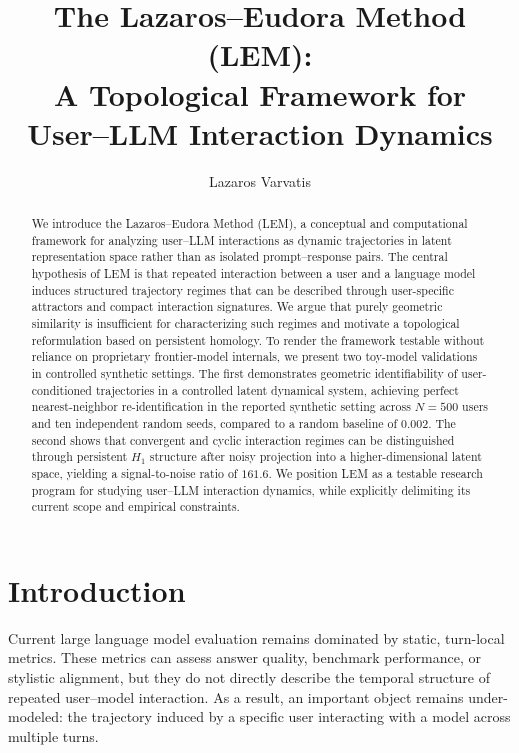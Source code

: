 \documentclass[11pt]{article}
\title{The Lazaros--Eudora Method (LEM):\\
A Topological Framework for User--LLM Interaction Dynamics}
\author{Lazaros Varvatis}
\date{}
\begin{document}
\maketitle


\begin{abstract}
We introduce the Lazaros--Eudora Method (LEM), a conceptual and computational
framework for analyzing user--LLM interactions as dynamic trajectories in latent
representation space rather than as isolated prompt--response pairs. The central
hypothesis of LEM is that repeated interaction between a user and a language
model induces structured trajectory regimes that can be described through
user-specific attractors and compact interaction signatures. We argue that purely
geometric similarity is insufficient for characterizing such regimes and motivate
a topological reformulation based on persistent homology. To render the framework
testable without reliance on proprietary frontier-model internals, we present two
toy-model validations in controlled synthetic settings. The first demonstrates
geometric identifiability of user-conditioned trajectories in a controlled latent
dynamical system, achieving perfect nearest-neighbor re-identification in the
reported synthetic setting across $N=500$ users and ten independent random seeds,
compared to a random baseline of $0.002$. The second shows that convergent and
cyclic interaction regimes can be distinguished through persistent $H_1$ structure
after noisy projection into a higher-dimensional latent space, yielding a
signal-to-noise ratio of $161.6$. We position LEM as a testable research program
for studying user--LLM interaction dynamics, while explicitly delimiting its
current scope and empirical constraints.
\end{abstract}


\section{Introduction}

Current large language model evaluation remains dominated by static, turn-local
metrics. These metrics can assess answer quality, benchmark performance, or
stylistic alignment, but they do not directly describe the temporal structure of
repeated user--model interaction. As a result, an important object remains
under-modeled: the trajectory induced by a specific user interacting with a model
across multiple turns.
\end{document}
